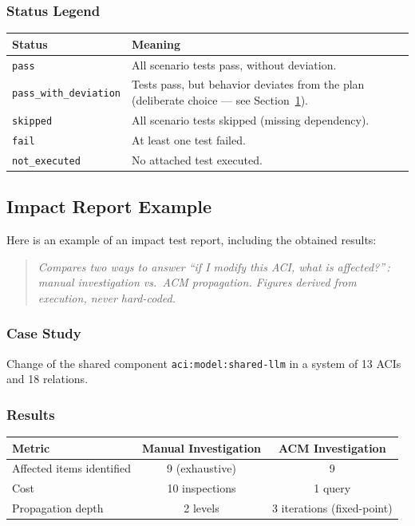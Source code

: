 \documentclass[10pt]{article}
\newcommand{\statuspass}{\textcolor{passgreen}{\texttt{pass}}}
\newcommand{\statusdeviation}{\textcolor{deviationorange}{\texttt{pass\_with\_deviation}}}
\newcommand{\statusskip}{\textcolor{skipgray}{\texttt{skipped}}}
\newcommand{\statusfail}{\textcolor{failred}{\texttt{fail}}}
\newcommand{\statusnotexec}{\texttt{not\_executed}}
\begin{document}
\subsubsection{Status Legend}

\begin{table}[htbp]
	\centering
	\begin{tabular}{@{}lp{10cm}@{}}
		\toprule
		\textbf{Status} & \textbf{Meaning} \\
		\midrule
		\statuspass{} & All scenario tests pass, without deviation. \\
		\statusdeviation{} & Tests pass, but behavior deviates from the plan (deliberate choice --- see Section~\ref{sec:documented-deviations}). \\
		\statusskip{} & All scenario tests skipped (missing dependency). \\
		\statusfail{} & At least one test failed. \\
		\statusnotexec{} & No attached test executed. \\
		\bottomrule
	\end{tabular}
	\label{sec:documented-deviations}
\end{table}
\subsection{Impact Report Example}
Here is an example of an impact test report, including the obtained results:
\begin{quote}
	\textit{Compares two ways to answer ``if I modify this ACI, what is affected?''\,: manual investigation vs.\ ACM propagation. Figures derived from execution, never hard-coded.}
\end{quote}

\subsubsection{Case Study}

Change of the shared component \texttt{aci:model:shared-llm} in a system of 13 ACIs and 18 relations.

\subsubsection{Results}

\begin{table}[htbp]
	\centering
	\begin{tabular}{@{}lcc@{}}
		\toprule
		\textbf{Metric} & \textbf{Manual Investigation} & \textbf{ACM Investigation} \\
		\midrule
		Affected items identified & 9 (exhaustive) & 9 \\
		Cost & 10 inspections & 1 query \\
		Propagation depth & 2 levels & 3 iterations (fixed-point) \\
		\bottomrule
	\end{tabular}
\end{table}
\end{document}
